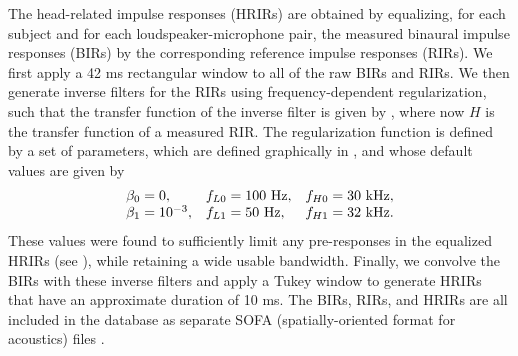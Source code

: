 The head-related impulse responses (HRIRs) are obtained by equalizing, for each subject and for each loudspeaker-microphone pair, the measured binaural impulse responses (BIRs) by the corresponding reference impulse responses (RIRs).
We first apply a 42 ms rectangular window to all of the raw BIRs and RIRs.
We then generate inverse filters for the RIRs using frequency-dependent regularization,
such that the transfer function of the inverse filter is given by , where now $H$ is the transfer function of a measured RIR.
The regularization function is defined by a set of parameters, which are defined graphically in , and whose default values are given by
\begin{equation*}
\begin{array}{l l l}
\beta_0 = 0, &f_{L0} = 100~\text{Hz}, &f_{H0} = 30~\text{kHz}, \\
\beta_1 = 10^{-3}, &f_{L1} = 50~\text{Hz}, &f_{H1} = 32~\text{kHz}.
\end{array}
\end{equation*}
These values were found to sufficiently limit any pre-responses in the equalized HRIRs (see ), while retaining a wide usable bandwidth. 
Finally, we convolve the BIRs with these inverse filters and apply a Tukey window to generate HRIRs that have an approximate duration of 10 ms.
The BIRs, RIRs, and HRIRs are all included in the database as separate SOFA (spatially-oriented format for acoustics) files \citep{AES69-2015}.